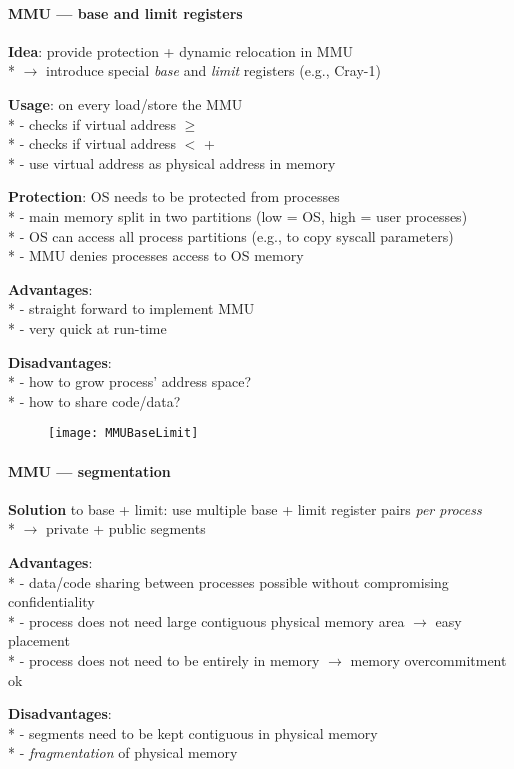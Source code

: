 \paragraph{MMU --- base and limit registers}
\begin{items}
  \item \textbf{Idea}: provide protection + dynamic relocation in MMU \\*
    \( \to \) introduce special \emph{base} and \emph{limit} registers (e.g., Cray-1)
  \item \textbf{Usage}: on every load/store the MMU \\*
    - checks if virtual address \( \geq \)  \\*
    - checks if virtual address \( < \)  +  \\*
    - use virtual address as physical address in memory
  \item \textbf{Protection}: OS needs to be protected from processes \\*
    - main memory split in two partitions (low = OS, high = user processes) \\*
    - OS can access all process partitions (e.g., to copy syscall parameters) \\*
    - MMU denies processes access to OS memory
  \item \textbf{Advantages}: \\*
    - straight forward to implement MMU \\*
    - very quick at run-time
  \item \textbf{Disadvantages}: \\*
    - how to grow process' address space? \\*
    - how to share code/data?
\end{items}
\begin{figure}[H]\centering\label{MMUBaseLimit}\texttt{[image: MMUBaseLimit]}\end{figure}

\paragraph{MMU --- segmentation}
\begin{items}
  \item \textbf{Solution} to base + limit: use multiple base + limit register pairs \emph{per process} \\*
  \( \to \) private + public segments
  \item \textbf{Advantages}: \\*
    - data/code sharing between processes possible without compromising confidentiality \\*
    - process does not need large contiguous physical memory area \( \to \) easy placement \\*
    - process does not need to be entirely in memory \( \to \) memory overcommitment ok
  \item \textbf{Disadvantages}: \\*
    - segments need to be kept contiguous in physical memory \\*
    - \emph{fragmentation} of physical memory
\end{items}

